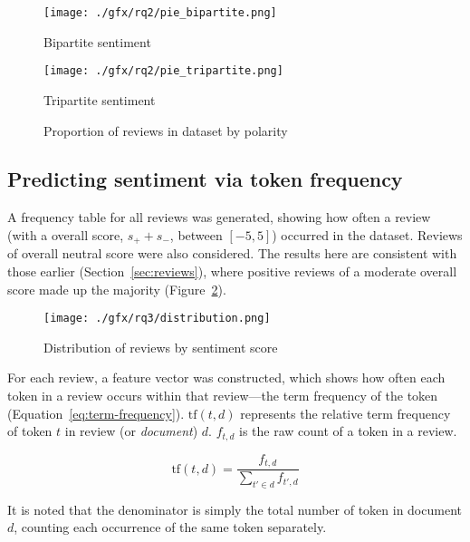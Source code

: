 \documentclass[12pt, a4paper]{pancake-article}
\begin{document}
\begin{figure}[htpb]
	\centering
	\begin{minipage}{0.5\textwidth}
		\centering
		\texttt{[image: ./gfx/rq2/pie\_bipartite.png]}
		\caption*{Bipartite sentiment}
	\end{minipage}\hfill
	\begin{minipage}{0.5\textwidth}
		\centering
		\texttt{[image: ./gfx/rq2/pie\_tripartite.png]}
		\caption*{Tripartite sentiment}
	\end{minipage}
	\caption{Proportion of reviews in dataset by polarity}
	\label{fig:pies}
\end{figure}

\subsection{Predicting sentiment via token frequency}

A frequency table for all reviews was generated, showing how
often a review (with a overall score, \(s_+ + s_-\), between \(\left[-5, 5\right]\))
occurred in the dataset. Reviews of overall neutral score were also considered.
The results here are consistent with those earlier (Section~\ref{sec:reviews}),
where positive reviews of a moderate overall score made up the majority (Figure~\ref{fig:distribution}).

\begin{figure}[htpb]
	\centering
	\texttt{[image: ./gfx/rq3/distribution.png]}
	\caption{Distribution of reviews by sentiment score}
	\label{fig:distribution}
\end{figure}

For each review, a feature vector was constructed, which shows how
often each token in a review occurs within that review---the term frequency
of the token (Equation~\ref{eq:term-frequency}). \(\text{tf}\left(t, d\right)\)
represents the relative term frequency of token \(t\) in review (or \textit{document})
\(d\). \(f_{t, d}\) is the raw count of a token in a review.

\begin{equation}
	\text{tf}\left(t, d\right) = \frac{f_{t, d}}{\sum_{t' \in d}^{}f_{t',d}}
	\label{eq:term-frequency}
\end{equation}

It is noted that the denominator is simply the total number of token in document \(d\),
counting each occurrence of the same token separately.
\end{document}
